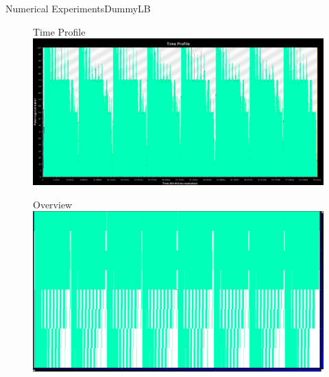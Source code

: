 \documentclass[]{beamer}
\begin{document}
\begin{frame}{Numerical Experiments}{DummyLB}
  \begin{figure}{Time Profile}
    \includegraphics[width=.65\paperwidth,height=.35\paperheight]{figures/LoadBalancing/TimeProfileDummyLB}
  \end{figure}
  \begin{figure}{\hspace{15pt}Overview}
    \includegraphics[width=.65\paperwidth,height=.35\paperheight]{figures/LoadBalancing/OverviewDummyLB}
  \end{figure}
\end{frame}
\end{document}

